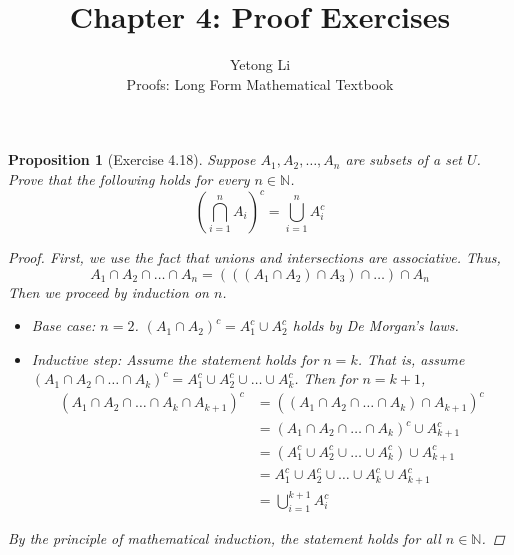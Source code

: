 \documentclass[12pt]{article}
\newcommand{\N}{\mathbb{N}} %
\newtheorem{proposition}{Proposition}
\begin{document}

\title{Chapter 4: Proof Exercises}
\author{Yetong Li \\ Proofs: Long Form Mathematical Textbook}

\maketitle


\begin{proposition}[Exercise 4.18]
  Suppose $A_1, A_2, \ldots, A_n$ are subsets of a set $U$.
  Prove that the following holds for every $n \in \N$.
  \[
    \left(\bigcap_{i=1}^n A_i\right)^c = \bigcup_{i=1}^n A_i^c
  \]
  \begin{proof}
    First, we use the fact that unions and intersections are associative.
    Thus,
    \[
      A_1 \cap A_2 \cap \ldots \cap A_n = (((A_1 \cap A_2) \cap A_3) \cap \ldots) \cap A_n
    \]
    Then we proceed by induction on $n$.
    \begin{itemize}
      \item Base case: $n = 2$. $(A_1 \cap A_2)^c = A_1^c \cup A_2^c$ holds by De Morgan's laws.
      \item Inductive step: Assume the statement holds for $n = k$.
            That is, assume $(A_1 \cap A_2 \cap \ldots \cap A_k)^c = A_1^c \cup A_2^c \cup \ldots \cup A_k^c$.
            Then for $n = k + 1$,
            \begin{align*}
              (A_1 \cap A_2 \cap \ldots \cap A_k \cap A_{k+1})^c & =
              ((A_1 \cap A_2 \cap \ldots \cap A_k) \cap A_{k+1})^c                                                            \\
                                                                 & = (A_1 \cap A_2 \cap \ldots \cap A_k)^c \cup A_{k+1}^c     \\
                                                                 & = (A_1^c \cup A_2^c \cup \ldots \cup A_k^c) \cup A_{k+1}^c \\
                                                                 & = A_1^c \cup A_2^c \cup \ldots \cup A_k^c \cup A_{k+1}^c   \\
                                                                 & = \bigcup_{i=1}^{k+1} A_i^c
            \end{align*}
    \end{itemize}
    By the principle of mathematical induction, the statement holds for all $n \in \N$.
  \end{proof}
\end{proposition}
\end{document}
